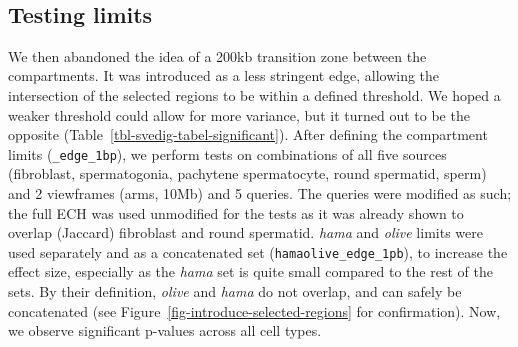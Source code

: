 \documentclass[
  11pt,
  a4paper,
]{scrbook}
\let\origfigure\figure
\let\endorigfigure\endfigure
\renewenvironment{figure}[1][2] {
    \expandafter\origfigure\expandafter[htbp]
} {
    \endorigfigure
}
\begin{document}
\begin{figure}
\begin{minipage}{0.49\linewidth}
{}


\end{minipage}%
%
\begin{minipage}{0.49\linewidth}



\end{minipage}%
%
\begin{minipage}{0.01\linewidth}
~\end{minipage}%

\caption{\label{fig-baboon-rs100-intersect}Comparing the A-compartment
edges of round spermatid (RS) with regions in baboons from hybrid
population where a) 95\% of sampled individuals have \emph{Papio
hamadryas} ancestry or b) 100\% of the samples have \emph{Papio anubis}
ancestry. The regions are extracted and lifted from PapAnu4 to rhemac10
using segment\_liftover.}

\end{figure}%

\subsection{Testing limits}\label{testing-limits}

We then abandoned the idea of a 200kb transition zone between the
compartments. It was introduced as a less stringent edge, allowing the
intersection of the selected regions to be within a defined threshold.
We hoped a weaker threshold could allow for more variance, but it turned
out to be the opposite (Table~\ref{tbl-svedig-tabel-significant}). After
defining the compartment limits (\texttt{\_edge\_1bp}), we perform tests
on combinations of all five sources (fibroblast, spermatogonia,
pachytene spermatocyte, round spermatid, sperm) and 2 viewframes (arms,
10Mb) and 5 queries. The queries were modified as such; the full ECH was
used unmodified for the tests as it was already shown to overlap
(Jaccard) fibroblast and round spermatid. \emph{hama} and \emph{olive}
limits were used separately and as a concatenated set
(\texttt{hamaolive\_edge\_1pb}), to increase the effect size, especially
as the \emph{hama} set is quite small compared to the rest of the sets.
By their definition, \emph{olive} and \emph{hama} do not overlap, and
can safely be concatenated (see
Figure~\ref{fig-introduce-selected-regions} for confirmation). Now, we
observe significant p-values across all cell types.
\end{document}
